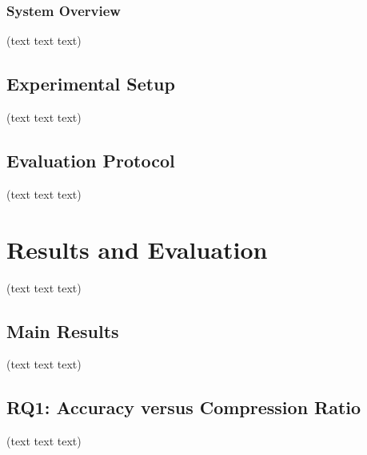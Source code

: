 \documentclass[10pt,a4paper,twocolumn]{article}
\begin{document}

\subsubsection{System Overview}
(text text text)


\subsection{Experimental Setup}
(text text text)


\subsection{Evaluation Protocol}
(text text text)


\section{Results and Evaluation}
(text text text)

\subsection{Main Results}
(text text text)


\subsection{RQ1: Accuracy versus Compression Ratio}
(text text text)
\end{document}
